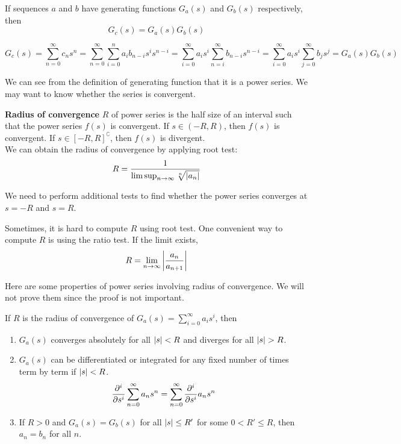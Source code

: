 \documentclass{huhtakm-template-book}
\begin{document}
\begin{lem}
	If sequences $a$ and $b$ have generating functions $G_{a}(s)$ and $G_{b}(s)$ respectively, then
	\begin{equation*}
		G_{c}(s)=G_{a}(s)G_{b}(s)
	\end{equation*}
\end{lem}
\begin{proofing}
	\begin{equation*}
		G_{c}(s)=\sum_{n=0}^{\infty}c_{n}s^{n}=\sum_{n=0}^{\infty}\sum_{i=0}^{n}a_{i}b_{n-i}s^{i}s^{n-i}=\sum_{i=0}^{\infty}a_{i}s^{i}\sum_{n=i}^{\infty}b_{n-i}s^{n-i}=\sum_{i=0}^{\infty}a_{i}s^{i}\sum_{j=0}^{\infty}b_{j}s^{j}=G_{a}(s)G_{b}(s)
	\end{equation*}
\end{proofing}
We can see from the definition of generating function that it is a power series. We may want to know whether the series is convergent.
\begin{defn}
	\textbf{Radius of convergence} $R$ of power series is the half size of an interval such that the power series $f(s)$ is convergent. If $s\in(-R,R)$, then $f(s)$ is convergent. If $s\in[-R,R]^{\complement}$, then $f(s)$ is divergent.\\
	We can obtain the radius of convergence by applying root test:
	\begin{equation*}
		R=\frac{1}{\limsup_{n\to\infty}\sqrt[n]{\left|{a_{n}}\right|}}
	\end{equation*}
\end{defn}
\begin{rem}
	We need to perform additional tests to find whether the power series converges at $s=-R$ and $s=R$.
\end{rem}
\begin{rem}
	Sometimes, it is hard to compute $R$ using root test. One convenient way to compute $R$ is using the ratio test. If the limit exists,
	\begin{equation*}
		R=\lim_{n\to\infty}\left|{\frac{a_{n}}{a_{n+1}}}\right|
	\end{equation*}
\end{rem}
Here are some properties of power series involving radius of convergence. We will not prove them since the proof is not important.
\begin{thm}
	If $R$ is the radius of convergence of $G_{a}(s)=\sum_{i=0}^{\infty}a_{i}s^{i}$, then
	\begin{enumerate}
		\item $G_{a}(s)$ converges absolutely for all $\left|{s}\right|<R$ and diverges for all $\abs{s}>R$.
		\item $G_{a}(s)$ can be differentiated or integrated for any fixed number of times term by term if $\left|{s}\right|<R$.
		\begin{equation*}
			\pdv*[order={i}]{\sum_{n=0}^{\infty}a_{n}s^{n}}{s}=\sum_{n=0}^{\infty}\pdv*[order={i}]{a_{n}s^{n}}{s}
		\end{equation*}
		\item If $R>0$ and $G_{a}(s)=G_{b}(s)$ for all $\left|{s}\right|\leq R'$ for some $0<R'\leq R$, then $a_{n}=b_{n}$ for all $n$.
	\end{enumerate}
\end{thm}
\end{document}
